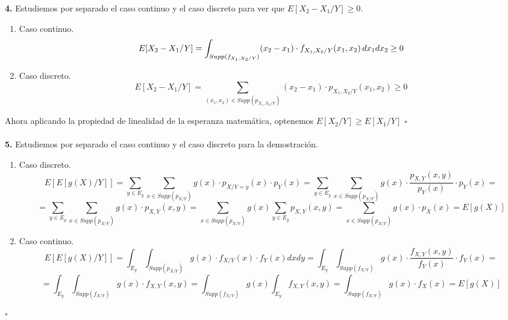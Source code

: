 \documentclass[fleqn]{article}
\newcommand*{\QED}{\hfill\ensuremath{\square}}
\begin{document}
    \textbf{4. } Estudiemos por separado el caso continuo y el caso discreto para ver que $E[X_2-X_1/Y]\geq 0$.

    \begin{enumerate}
        \item Caso continuo. \\
                $$E[X_2-X_1/Y] = \int_{Supp(f_{X_1,X_2/Y})} (x_2 - x_1) \cdot f_{X_1, X_2 /Y} (x_1,x_2) \thinspace dx_1dx_2 \geq 0 $$
        \item Caso discreto. \\ 
                $$E[X_2-X_1/Y] = \sum_{(x_1, x_2) \in Supp(p_{X_1,X_2/Y})} (x_2 - x_1) \cdot p_{X_1, X_2 /Y} (x_1,x_2) \geq 0 $$
    \end{enumerate}

    Ahora aplicando la propiedad de linealidad de la esperanza matemática, optenemos $E[X_2/Y] \geq E[X_1/Y]$
    \QED \\ \\



    \textbf{5. } Estudiemos por separado el caso continuo y el caso discreto para la demostración.
    \begin{enumerate}
        \item Caso discreto. \\ 
                $$E[E[g(X)/Y]] = \sum _{y\in E_y} \sum_{x \in Supp(p_{X/Y})} g(x) \cdot p_{X/Y=y}(x) \cdot p_{Y}(x) = 
                \sum _{y\in E_y} \sum_{x \in Supp(p_{X/Y})} g(x) \cdot \frac{p_{X,Y}(x,y)}{p_{Y}(x)} \cdot p_{Y}(x) = $$
                $$ = \sum _{y\in E_y} \sum_{x \in Supp(p_{X/Y})} g(x) \cdot p_{X,Y}(x,y) = \sum_{x \in Supp(p_{X/Y})} g(x) \sum _{y\in E_y}  p_{X,Y}(x,y) = 
                \sum_{x \in Supp(p_{X/Y})} g(x) \cdot p_{X}(x) = E[g(X)]$$

        \item Caso continuo. \\
                $$E[E[g(X)/Y]] = \int _{E_y} \int_{Supp(p_{X/Y})} g(x) \cdot f_{X/Y}(x) \cdot f_{Y}(x) dxdy = 
                \int _{E_y} \int_{Supp(f_{X/Y})} g(x) \cdot \frac{f_{X,Y}(x,y)}{f_{Y}(x)} \cdot f_{Y}(x) = $$
                $$ = \int _{E_y} \int_{Supp(f_{X/Y})} g(x) \cdot f_{X,Y}(x,y) = \int_{Supp(f_{X/Y})} g(x) \int _{E_y}  f_{X,Y}(x,y) = 
                \int_{Supp(f_{X/Y})} g(x) \cdot f_{X}(x) = E[g(X)]$$
    \end{enumerate}
    \QED \\ \\
\end{document}
